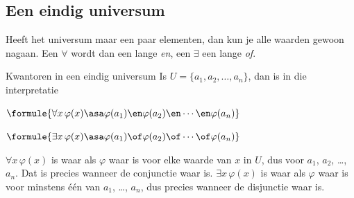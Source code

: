 
\begin{oefeningen}
\end{oefeningen}

\subsection{Een eindig universum}

Heeft het universum maar een paar elementen, dan kun je alle waarden gewoon nagaan. Een $\forall$ wordt dan een lange \textit{en}, een $\exists$ een lange \textit{of}.

\begin{theorie}
\begin{stelling}{Kwantoren in een eindig universum}
Is $U = \{a_1, a_2, \ldots, a_n\}$, dan is in die interpretatie

\vspace{1mm}
\qquad $\formule{\forall x\, \varphi(x) \asa \varphi(a_1) \en \varphi(a_2) \en \cdots \en \varphi(a_n)}$

\vspace{1mm}
\qquad $\formule{\exists x\, \varphi(x) \asa \varphi(a_1) \of \varphi(a_2) \of \cdots \of \varphi(a_n)}$
\end{stelling}

\begin{bewijs}
$\forall x\, \varphi(x)$ is waar als $\varphi$ waar is voor elke waarde van $x$ in $U$, dus voor $a_1$, $a_2$, \ldots, $a_n$. Dat is precies wanneer de conjunctie waar is. $\exists x\, \varphi(x)$ is waar als $\varphi$ waar is voor minstens één van $a_1$, \ldots, $a_n$, dus precies wanneer de disjunctie waar is.
\end{bewijs}
\end{theorie}

